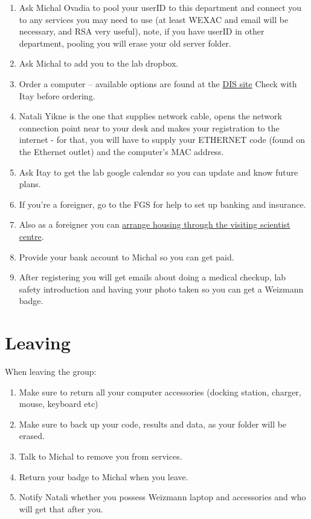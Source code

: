 \documentclass[
]{book}
\providecommand{\tightlist}{%
  \setlength{\itemsep}{0pt}\setlength{\parskip}{0pt}}
\begin{document}
\begin{enumerate}
\def\labelenumi{\arabic{enumi}.}
\tightlist
\item
  Ask Michal Ovadia to pool your userID to this department and connect you to any services you may need to use (at least WEXAC and email will be necessary, and RSA very useful), note, if you have userID in other department, pooling you will erase your old server folder.
\item
  Ask Michal to add you to the lab dropbox.
\item
  Order a computer -- available options are found at the \href{http://www.weizmann.ac.il/DIS/computing-hardware/pc/windows-laptops}{DIS site}
  Check with Itay before ordering.
\item
  Natali Yikne is the one that supplies network cable, opens the network connection point near to your desk and makes your registration to the internet - for that, you will have to supply your ETHERNET code (found on the Ethernet outlet) and the computer's MAC address.
\item
  Ask Itay to get the lab google calendar so you can update and know future plans.
\item
  If you're a foreigner, go to the FGS for help to set up banking and insurance.
\item
  Also as a foreigner you can \href{http://www.weizmann.ac.il/vs/}{arrange housing through the visiting scientist centre}.
\item
  Provide your bank account to Michal so you can get paid.
\item
  After registering you will get emails about doing a medical checkup, lab safety introduction and having your photo taken so you can get a Weizmann badge.
\end{enumerate}

\hypertarget{leaving}{%
\section{Leaving}\label{leaving}}

When leaving the group:

\begin{enumerate}
\def\labelenumi{\arabic{enumi}.}
\tightlist
\item
  Make sure to return all your computer accessories (docking station, charger, mouse, keyboard etc)
\item
  Make sure to back up your code, results and data, as your folder will be erased.
\item
  Talk to Michal to remove you from services.
\item
  Return your badge to Michal when you leave.
\item
  Notify Natali whether you possess Weizmann laptop and accessories and who will get that after you.
\end{enumerate}
\end{document}
